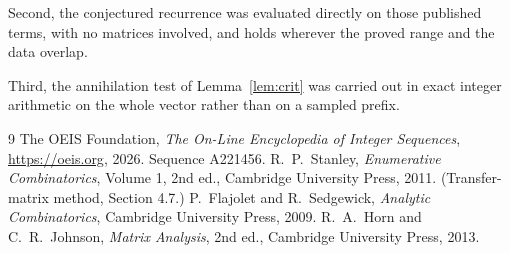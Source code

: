 \documentclass[11pt,a4paper]{article}
\theoremstyle{plain}
\theoremstyle{definition}
\begin{document}
Second, the conjectured recurrence was evaluated directly on those published terms, with no
matrices involved, and holds wherever the proved range and the data overlap.

Third, the annihilation test of Lemma~\ref{lem:crit} was carried out in exact integer
arithmetic on the whole vector rather than on a sampled prefix.

\begin{thebibliography}{9}
 The OEIS Foundation, \emph{The On-Line Encyclopedia of Integer
Sequences}, \url{https://oeis.org}, 2026. Sequence A221456.
 R.~P.~Stanley, \emph{Enumerative Combinatorics}, Volume 1, 2nd ed.,
Cambridge University Press, 2011. (Transfer-matrix method, Section 4.7.)
 P.~Flajolet and R.~Sedgewick, \emph{Analytic Combinatorics}, Cambridge
University Press, 2009.
 R.~A.~Horn and C.~R.~Johnson, \emph{Matrix Analysis}, 2nd ed., Cambridge
University Press, 2013.
\end{thebibliography}
\end{document}
